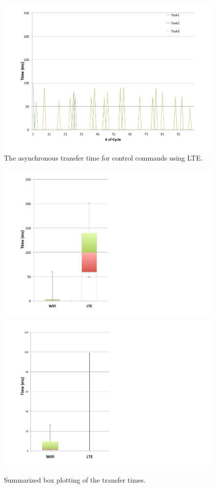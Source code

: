 \begin{figure}[!t]
 \centering
 \includegraphics[width=0.8\hsize]{fig/No5_Andrive_serv_cycle_LTE_only_send.pdf}
 \caption{The asynchronous transfer time for control commands using LTE.}
 \label{fig:no5}
\end{figure}

\begin{figure}[!t]
 \centering
 \includegraphics[width=0.45\hsize]{fig/No3_Andrive_boxplot_compare_WiFi_and_LTE.pdf}
 \includegraphics[width=0.45\hsize]{fig/No7_Andrive_only_send_boxplot_compare_WiFi_and_LTE.pdf}
 \caption{Summarized box plotting of the transfer times.}
 \label{fig:no3_7}
\end{figure}

